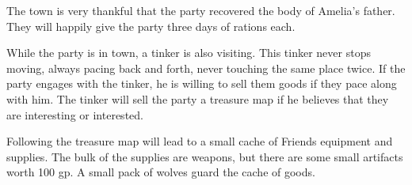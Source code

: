 The town is very thankful that the party recovered the body of Amelia's father.
They will happily give the party three days of rations each.

While the party is in town, a tinker is also visiting.
This tinker never stops moving, always pacing back and forth, never touching the same place twice.
If the party engages with the tinker, he is willing to sell them goods if they pace along with him.
The tinker will sell the party a treasure map if he believes that they are interesting or interested.

Following the treasure map will lead to a small cache of Friends equipment and supplies.
The bulk of the supplies are weapons, but there are some small artifacts worth 100 gp.
A small pack of wolves guard the cache of goods.
